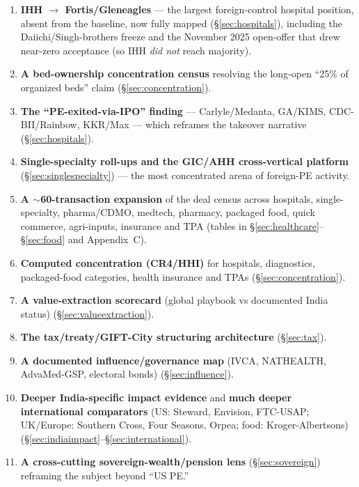 \documentclass[11pt,a4paper]{article}
\begin{document}
\begin{enumerate}[leftmargin=1.6em,itemsep=3pt]
\item \textbf{IHH $\rightarrow$ Fortis/Gleneagles} --- the largest foreign-control hospital position, absent from the baseline, now fully mapped (\S\ref{sec:hospitals}), including the Daiichi/Singh-brothers freeze and the November 2025 open-offer that drew near-zero acceptance (so IHH \emph{did not} reach majority).
\item \textbf{A bed-ownership concentration census} resolving the long-open ``25\% of organized beds'' claim (\S\ref{sec:concentration}).
\item \textbf{The ``PE-exited-via-IPO'' finding} --- Carlyle/Medanta, GA/KIMS, CDC-BII/Rainbow, KKR/Max --- which reframes the takeover narrative (\S\ref{sec:hospitals}).
\item \textbf{Single-specialty roll-ups and the GIC/AHH cross-vertical platform} (\S\ref{sec:singlespecialty}) --- the most concentrated arena of foreign-PE activity.
\item \textbf{A $\sim$60-transaction expansion} of the deal census across hospitals, single-specialty, pharma/CDMO, medtech, pharmacy, packaged food, quick commerce, agri-inputs, insurance and TPA (tables in \S\ref{sec:healthcare}--\S\ref{sec:food} and Appendix~C).
\item \textbf{Computed concentration (CR4/HHI)} for hospitals, diagnostics, packaged-food categories, health insurance and TPAs (\S\ref{sec:concentration}).
\item \textbf{A value-extraction scorecard} (global playbook vs documented India status) (\S\ref{sec:valueextraction}).
\item \textbf{The tax/treaty/GIFT-City structuring architecture} (\S\ref{sec:tax}).
\item \textbf{A documented influence/governance map} (IVCA, NATHEALTH, AdvaMed-GSP, electoral bonds) (\S\ref{sec:influence}).
\item \textbf{Deeper India-specific impact evidence} and \textbf{much deeper international comparators} (US: Steward, Envision, FTC-USAP; UK/Europe: Southern Cross, Four Seasons, Orpea; food: Kroger-Albertsons) (\S\ref{sec:indiaimpact}--\S\ref{sec:international}).
\item \textbf{A cross-cutting sovereign-wealth/pension lens} (\S\ref{sec:sovereign}) reframing the subject beyond ``US PE.''
\end{enumerate}

\end{document}

